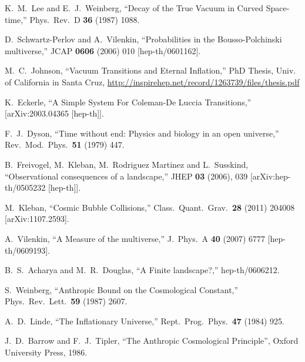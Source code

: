 \documentclass[12pt]{article}
\numberwithin{equation}{section}
\begin{document}
\begin{thebibliography}{999}
  K.~M.~Lee and E.~J.~Weinberg,
  ``Decay of the True Vacuum in Curved Space-time,''
  Phys.\ Rev.\ D {\bf 36} (1987) 1088.

  D.~Schwartz-Perlov and A.~Vilenkin,
  ``Probabilities in the Bousso-Polchinski multiverse,''
  JCAP {\bf 0606} (2006) 010 [hep-th/0601162].
  
  M.~C.~Johnson, ``Vacuum Transitions and Eternal Inflation,'' PhD Thesis, Univ. of California in Santa Cruz,
\url{http://inspirehep.net/record/1263739/files/thesis.pdf}

K.~Eckerle,
``A Simple System For Coleman-De Luccia Transitions,''
[arXiv:2003.04365 [hep-th]].

  F.~J.~Dyson,
  ``Time without end: Physics and biology in an open
  universe,'' Rev.\ Mod.\ Phys.\  {\bf 51} (1979) 447.

B.~Freivogel, M.~Kleban, M.~Rodriguez Martinez and L.~Susskind,
``Observational consequences of a landscape,''
JHEP \textbf{03} (2006), 039
[arXiv:hep-th/0505232 [hep-th]].

  M.~Kleban, ``Cosmic Bubble Collisions,''
  Class.\ Quant.\ Grav.\  {\bf 28} (2011) 204008\\{}
  [arXiv:1107.2593].   

  A.~Vilenkin,
  ``A Measure of the multiverse,''
  J.\ Phys.\ A {\bf 40} (2007) 6777
  [hep-th/0609193].

  B.~S.~Acharya and M.~R.~Douglas,
  ``A Finite landscape?,'' hep-th/0606212.
  
  S.~Weinberg,
  ``Anthropic Bound on the Cosmological Constant,''
  Phys.\ Rev.\ Lett.\  {\bf 59} (1987) 2607.
  
  A.~D.~Linde,
  ``The Inflationary Universe,''
  Rept.\ Prog.\ Phys.\  {\bf 47} (1984) 925.
  
J.~D.~Barrow and F.~J.~Tipler, ``The Anthropic Cosmological Principle'', Oxford University Press, 1986.


\end{thebibliography}
\end{document}
